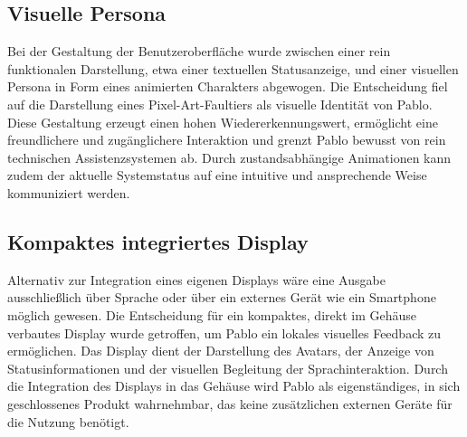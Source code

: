\subsection{Visuelle Persona}

Bei der Gestaltung der Benutzeroberfläche wurde zwischen einer rein funktionalen Darstellung, etwa einer textuellen Statusanzeige, und einer visuellen Persona in Form eines animierten Charakters abgewogen.
Die Entscheidung fiel auf die Darstellung eines Pixel-Art-Faultiers als visuelle Identität von Pablo.
Diese Gestaltung erzeugt einen hohen Wiedererkennungswert, ermöglicht eine freundlichere und zugänglichere Interaktion und grenzt Pablo bewusst von rein technischen Assistenzsystemen ab.
Durch zustandsabhängige Animationen kann zudem der aktuelle Systemstatus auf eine intuitive und ansprechende Weise kommuniziert werden.

\subsection{Kompaktes integriertes Display}

Alternativ zur Integration eines eigenen Displays wäre eine Ausgabe ausschließlich über Sprache oder über ein externes Gerät wie ein Smartphone möglich gewesen.
Die Entscheidung für ein kompaktes, direkt im Gehäuse verbautes Display wurde getroffen, um Pablo ein lokales visuelles Feedback zu ermöglichen.
Das Display dient der Darstellung des Avatars, der Anzeige von Statusinformationen und der visuellen Begleitung der Sprachinteraktion.
Durch die Integration des Displays in das Gehäuse wird Pablo als eigenständiges, in sich geschlossenes Produkt wahrnehmbar, das keine zusätzlichen externen Geräte für die Nutzung benötigt.